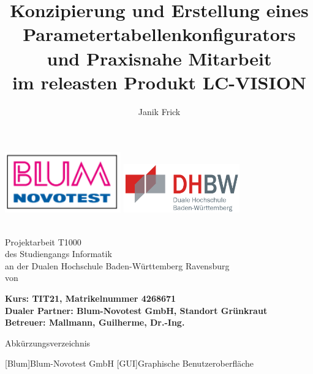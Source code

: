 \documentclass[12pt,a4paper]{article}
\author{Janik Frick}
\title{Konzipierung und Erstellung eines Parametertabellenkonfigurators und Praxisnahe Mitarbeit\\
 im releasten Produkt LC-VISION}
\newcommand{\dualerPartner}{Blum-Novotest GmbH, Standort Grünkraut}
\newcommand{\hochschule}{Dualen Hochschule Baden-Württemberg Ravensburg}
\newcommand{\betreuer}{Mallmann, Guilherme, Dr.-Ing.}
\newcommand{\studiengang}{Informatik}
\newcommand{\kurs}{TIT21, Matrikelnummer 4268671}
\begin{document}
\begin{titlepage}
\includegraphics[width=50mm,scale=1]{blum-logo.PNG}
\hfill
\includegraphics[width=50mm,scale=1]{dhbw.png}
   \begin{center}
       \textbf{\huge{\thetitle}}\\
       \vspace{2cm}
       \Large{Projektarbeit T1000\\
       des Studiengangs \studiengang\\
       an der \hochschule\\
       \vspace{1.5cm}
       von\\
       \vspace{0.5cm}
       \theauthor}
       
   \end{center}
       \vspace{1.6cm}
       \noindent
       \vspace{0.3cm}
       \textbf{\large{Kurs: \kurs}}\\
       \vspace{0.3cm}
       \textbf{\large{Dualer Partner: \dualerPartner}}\\
       \vspace{0.3cm}
       \textbf{\large{Betreuer: \betreuer}}
       

\end{titlepage}
\thispagestyle{empty}
\onehalfspacing
\noindent
{\Large Abkürzungsverzeichnis}\\
\newline
\begin{acronym}[Abkürzungsverzeichnis]
[Blum]{Blum-Novotest GmbH}
[GUI]{Graphische Benutzeroberfläche}
\end{acronym}
\newpage
\thispagestyle{empty}
\listoffigures
\newpage
\thispagestyle{empty}
\tableofcontents
\thispagestyle{empty}
\newpage
\setcounter{page}{1}
\end{document}
